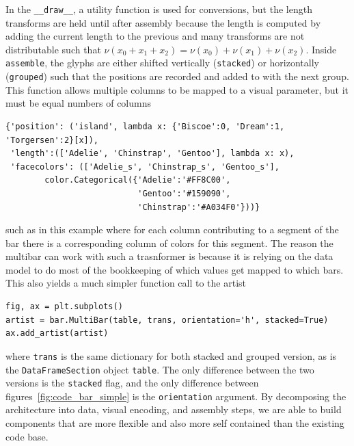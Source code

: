 \documentclass[../main.tex]{subfiles}
\begin{document}
In the \texttt{__draw__}, a utility function is used for conversions, but the length transforms are held until after assembly because the length is computed by adding the current length to the previous and many transforms are not distributable such that $\nu(x_0 + x_1 + x_2) = \nu(x_0) + \nu(x_1) + \nu(x_2)$. Inside \texttt{assemble}, the glyphs are either shifted vertically (\texttt{stacked}) or horizontally (\texttt{grouped}) such that the positions are recorded and added to with the next group. This function allows multiple columns to be mapped to a visual parameter, but it must be equal numbers of columns
\begin{verbatim}
{'position': ('island', lambda x: {'Biscoe':0, 'Dream':1, 'Torgersen':2}[x]),
 'length':(['Adelie', 'Chinstrap', 'Gentoo'], lambda x: x),
 'facecolors': (['Adelie_s', 'Chinstrap_s', 'Gentoo_s'], 
        color.Categorical({'Adelie':'#FF8C00',
                           'Gentoo':'#159090', 
                           'Chinstrap':'#A034F0'}))}
\end{verbatim}
such as in this example where for each column contributing to a segment of the bar there is a corresponding column of colors for this segment. The reason the multibar can work with such a trasnformer is because it is relying on the data model to do most of the bookkeeping of which values get mapped to which bars. This also yields a much simpler function call to the artist

\begin{verbatim}
fig, ax = plt.subplots()
artist = bar.MultiBar(table, trans, orientation='h', stacked=True)
ax.add_artist(artist)
\end{verbatim}

where \texttt{trans} is the same dictionary for both stacked and grouped version, as is the \texttt{DataFrameSection} object \texttt{table}. The only difference between the two versions is the \texttt{stacked} flag, and the only difference between figures~\ref{fig:code_bar_simple} is the \texttt{orientation} argument. By decomposing the architecture into data, visual encoding, and assembly steps, we are able to build components that are more flexible and also more self contained than the existing code base. 
\end{document}
